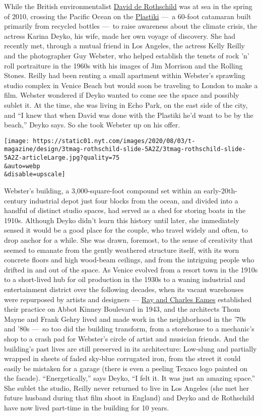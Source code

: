 While the British environmentalist
\href{https://tmagazine.blogs.nytimes.com/2010/03/24/profile-in-style-david-de-rothschild/}{David
de Rothschild} was at sea in the spring of 2010, crossing the Pacific
Ocean on the \href{https://theplastiki.com/}{Plastiki} ---~a 60-foot
catamaran built primarily from recycled bottles ---~to raise awareness
about the climate crisis, the actress Karina Deyko, his wife, made her
own voyage of discovery. She had recently met, through a mutual friend
in Los Angeles, the actress Kelly Reilly and the photographer Guy
Webster, who helped establish the tenets of rock 'n' roll portraiture in
the 1960s with his images of Jim Morrison and the Rolling Stones. Reilly
had been renting a small apartment within Webster's sprawling studio
complex in Venice Beach but would soon be traveling to London to make a
film. Webster wondered if Deyko wanted to come see the space and
possibly sublet it. At the time, she was living in Echo Park, on the
east side of the city, and ``I knew that when David was done with the
Plastiki he'd want to be by the beach,'' Deyko says. So she took Webster
up on his offer.

\texttt{[image: https://static01.nyt.com/images/2020/08/03/t-magazine/design/3tmag-rothschild-slide-5A2Z/3tmag-rothschild-slide-5A2Z-articleLarge.jpg?quality=75\\\&auto=webp\\\&disable=upscale]}

Webster's building, a 3,000-square-foot compound set within an
early-20th-century industrial depot just four blocks from the ocean, and
divided into a handful of distinct studio spaces, had served as a shed
for storing boats in the 1910s. Although Deyko didn't learn this history
until later, she immediately sensed it would be a good place for the
couple, who travel widely and often, to drop anchor for a while. She was
drawn, foremost, to the sense of creativity that seemed to emanate from
the gently weathered structure itself, with its worn concrete floors and
high wood-beam ceilings, and from the intriguing people who drifted in
and out of the space. As Venice evolved from a resort town in the 1910s
to a short-lived hub for oil production in the 1930s to a waning
industrial and entertainment district over the following decades, when
its vacant warehouses were repurposed by artists and designers ---
\href{https://www.nytimes.com/2020/05/15/arts/ray-charles-eames-artists.html}{Ray
and Charles Eames} established their practice on Abbot Kinney Boulevard
in 1943, and the architects Thom Mayne and Frank Gehry lived and made
work in the neighborhood in the '70s and '80s ---~so too did the
building transform, from a storehouse to a mechanic's shop to a crash
pad for Webster's circle of artist and musician friends. And the
building's past lives are still preserved in its architecture: Low-slung
and partially wrapped in sheets of faded sky-blue corrugated iron, from
the street it could easily be mistaken for a garage (there is even a
peeling Texaco logo painted on the facade). ``Energetically,'' says
Deyko, ``I felt it. It was just an amazing space.'' She sublet the
studio, Reilly never returned to live in Los Angeles (she met her future
husband during that film shoot in England) and Deyko and de Rothschild
have now lived part-time in the building for 10 years.

